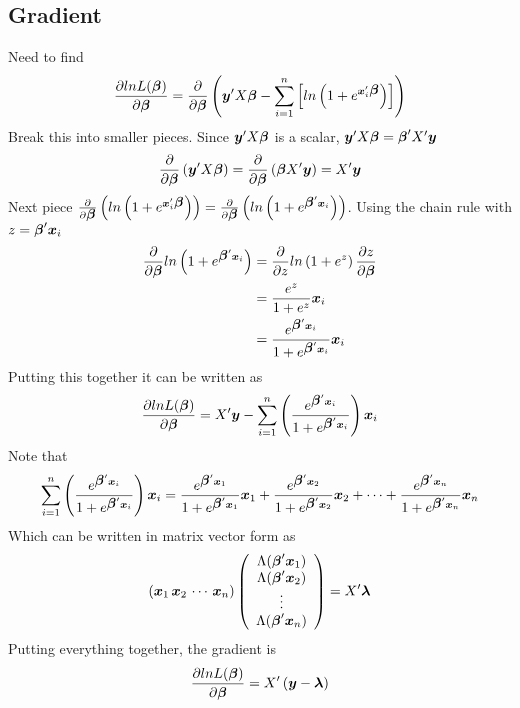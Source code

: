 \documentclass{article}
\newcommand{\bbeta}{\mbox{\boldmath $\beta$}}
\newcommand{\blambda}{\mbox{\boldmath $\lambda$}}
\begin{document}
\subsection*{Gradient}
Need to find
\begin{equation}
\frac{\partial lnL(\bbeta)}{\partial\bbeta}=\frac{\partial}{\partial\bbeta}\left({\bm y}'X\bbeta
-\sum_{i=1}^n\left[
ln\left(1+e^{{{\bm x'_i}\bbeta}}\right)
\right]\right)
\end{equation}
Break this into smaller pieces. Since ${\bm y}'X\bbeta$ is a scalar, ${\bm y}'X\bbeta=\bbeta' X'{\bm y}$
\begin{equation}
\frac{\partial}{\partial\bbeta}\left({\bm y}'X\bbeta\right)=\frac{\partial}{\partial\bbeta}\left(\bbeta X'{\bm y}\right)=X'{\bm y}
\end{equation}
Next piece $\frac{\partial}{\partial\bbeta}\left(ln\left(1+e^{{{\bm x'_i}\bbeta}}\right)\right)=
\frac{\partial}{\partial\bbeta}\left(ln\left(1+e^{{\bbeta'{\bm x_i}}}\right)\right)$.  Using the chain rule with $z=\bbeta'{\bm x_i}$
\begin{align}
\frac{\partial}{\partial\bbeta}ln\left(1+e^{{\bbeta'{\bm x_i}}}\right)&=\frac{\partial}{\partial z}ln\left(1+e^{z}\right)\frac{\partial z}{\partial {\bbeta}}\\
&=\frac{e^{z}}{1+e^{z}}{\bm x_i}\\
&=\frac{e^{\bbeta'{\bm x_i}}}{1+e^{\bbeta'{\bm x_i}}}{\bm x_i}
\end{align} 
Putting this together it can be written as
\begin{equation}
\frac{\partial lnL(\bbeta)}{\partial\bbeta}=X'{\bm y}-\sum_{i=1}^{n}\left(
\frac{e^{\bbeta'{\bm x_i}}}{1+e^{\bbeta'{\bm x_i}}}
\right){\bm x_i}
\end{equation}
Note that 
\begin{equation*}
\sum_{i=1}^{n}\left(
\frac{e^{\bbeta'{\bm x_i}}}{1+e^{\bbeta'{\bm x_i}}}
\right){\bm x_i}= \frac{e^{\bbeta'{\bm x_1}}}{1+e^{\bbeta'{\bm x_1}}}{\bm x_1}+
\frac{e^{\bbeta'{\bm x_2}}}{1+e^{\bbeta'{\bm x_2}}}{\bm x_2}+\cdots+
\frac{e^{\bbeta'{\bm x_n}}}{1+e^{\bbeta'{\bm x_n}}}{\bm x_n}
\end{equation*}
Which can be written in matrix vector form as
\begin{equation}
\left({\bm x_1}\,{\bm x_2}\,\cdots\,{\bm x_n}\right)
\left(\begin{array}{c}
\Lambda({\bbeta'{\bm x_1}})\\
\Lambda({\bbeta'{\bm x_2}})\\
\vdots\\
\Lambda({\bbeta'{\bm x_n}})
\end{array}
\right)=X'\blambda
\end{equation}
Putting everything together, the gradient is
\begin{equation}
\frac{\partial lnL(\bbeta)}{\partial\bbeta}=X'\left({\bm y}-\blambda\right)
\end{equation}
\end{document}
